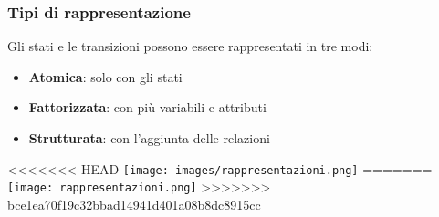 \subsubsection{Tipi di rappresentazione}
Gli stati e le transizioni possono essere rappresentati in tre modi:
\begin{itemize}
	\item \textbf{Atomica}: solo con gli stati
	\item \textbf{Fattorizzata}: con più variabili e attributi
	\item \textbf{Strutturata}: con l'aggiunta delle relazioni
\end{itemize}
\begin{center}
<<<<<<< HEAD
	\texttt{[image: images/rappresentazioni.png]}
=======
	\texttt{[image: rappresentazioni.png]}
>>>>>>> bce1ea70f19c32bbad14941d401a08b8dc8915cc
\end{center}